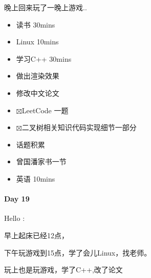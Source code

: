 \documentclass[UTF8,a4paper,8pt]{ctexbook}
\begin{document}
		 	 晚上回来玩了一晚上游戏..
		 	 \begin{itemize}
		 	 	\item  \makebox[0pt][l]{$\square$}\raisebox{.15ex}{\hspace{0.1em}$\checkmark$}读书  30mins	
		 	 	\item  \makebox[0pt][l]{$\square$}\raisebox{.15ex}{\hspace{0.1em}$\checkmark$}Linux 10mins	  
		 	 	\item  \makebox[0pt][l]{$\square$}\raisebox{.15ex}{\hspace{0.1em}$\checkmark$}学习C++ 30mins 
		 	 	\item  \makebox[0pt][l]{$\square$}\raisebox{.15ex}{\hspace{0.1em}$\checkmark$}做出渲染效果
		 	 	\item  修改中文论文
		 	 	
		 	 	\item  $\boxtimes$LeetCode 一题
		 	 	\item  $\boxtimes$二叉树相关知识代码实现细节一部分
		 	 	
		 	 	\item  \makebox[0pt][l]{$\square$}\raisebox{.15ex}{\hspace{0.1em}$\checkmark$}话题积累 
		 	 	\item  \makebox[0pt][l]{$\square$}\raisebox{.15ex}{\hspace{0.1em}$\checkmark$}曾国潘家书一节	
		 	 	\item  英语 10mins 	 
		 	 \end{itemize}
 	 \paragraph{Day 19      \quad     }
		 	 Hello :
		 	 
		 	 早上起床已经12点，
		 	 
		 	 下午玩游戏到15点，学了会儿Linux，找老师。
		 	 
		 	 玩上也是玩游戏，学了C++,改了论文
		 	 
\end{document}

